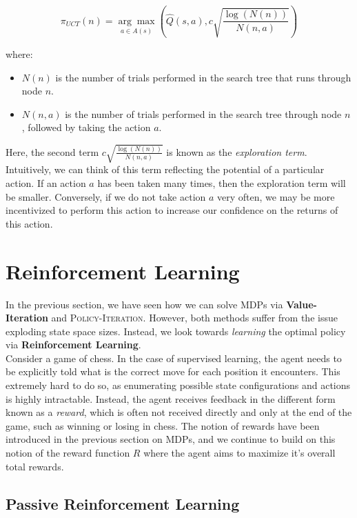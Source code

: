 \documentclass[11pt]{article}
\begin{document}
$$
\pi_{UCT}(n) = \underset{a \in A(s)}{\arg\max} \left( \hat{Q}(s, a), c \sqrt{\frac{\log(N(n))}{N(n, a)}} \right)
$$

where:

\begin{itemize}
    \item $N(n)$ is the number of trials performed in the search tree that runs through node $n$.
    \item $N(n, a)$ is the number of trials performed in the search tree through node $n$, followed by taking the action $a$.
\end{itemize}

Here, the second term $c \sqrt{\frac{\log(N(n))}{N(n, a)}}$ is known as the \textit{exploration term}. Intuitively, we can think of this term reflecting the potential of a particular action. If an action $a$ has been taken many times, then the exploration term will be smaller. Conversely, if we do not take action $a$ very often, we may be more incentivized to perform this action to increase our confidence on the returns of this action.

\pagebreak
\section{Reinforcement Learning}

In the previous section, we have seen how we can solve MDPs via \textbf{Value-Iteration} and \textsc{Policy-Iteration}. However, both methods suffer from the issue exploding state space sizes. Instead, we look towards \textit{learning} the optimal policy via \textbf{Reinforcement Learning}.\\

Consider a game of chess. In the case of supervised learning, the agent needs to be explicitly told what is the correct move for each position it encounters. This extremely hard to do so, as enumerating possible state configurations and actions is highly intractable. Instead, the agent receives feedback in the different form known as a \textit{reward}, which is often not received directly and only at the end of the game, such as winning or losing in chess. The notion of rewards have been introduced in the previous section on MDPs, and we continue to build on this notion of the reward function $R$ where the agent aims to maximize it's overall total rewards.

\subsection{Passive Reinforcement Learning}
\end{document}

